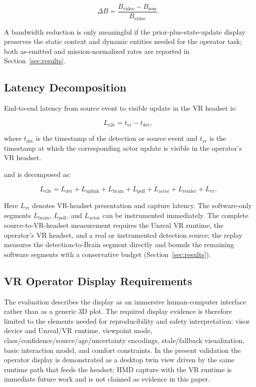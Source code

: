 \documentclass[fleqn]{VRIH2025}
\begin{document}
\begin{equation}
\Delta B = \frac{B_{\mathrm{video}} - B_{\mathrm{sem}}}{B_{\mathrm{video}}}.
\label{eq:bandwidth-reduction}
\end{equation}

A bandwidth reduction is only meaningful if the prior-plus-state-update display preserves the static context and dynamic entities needed for the operator task; both as-emitted and mission-normalized rates are reported in Section~\ref{sec:results}.

\subsection{Latency Decomposition}

End-to-end latency from source event to visible update in the VR headset is:

\begin{equation}
L_{\mathrm{e2e}} = t_{\mathrm{vr}} - t_{\mathrm{det}},
\label{eq:e2e-latency}
\end{equation}

where \(t_{\mathrm{det}}\) is the timestamp of the detection or source event and \(t_{\mathrm{vr}}\) is the timestamp at which the corresponding actor update is visible in the operator's VR headset.

and is decomposed as:

\begin{equation}
L_{\mathrm{e2e}} =
L_{\mathrm{det}} +
L_{\mathrm{uplink}} +
L_{\mathrm{brain}} +
L_{\mathrm{poll}} +
L_{\mathrm{actor}} +
L_{\mathrm{render}} +
L_{\mathrm{vr}}.
\label{eq:latency-components}
\end{equation}

Here \(L_{\mathrm{vr}}\) denotes VR-headset presentation and capture latency. The software-only segments \(L_{\mathrm{brain}}\), \(L_{\mathrm{poll}}\), and \(L_{\mathrm{actor}}\) can be instrumented immediately. The complete source-to-VR-headset measurement requires the Unreal VR runtime, the operator's VR headset, and a real or instrumented detection source; the replay measures the detection-to-Brain segment directly and bounds the remaining software segments with a conservative budget (Section~\ref{sec:results}).

\subsection{VR Operator Display Requirements}

The evaluation describes the display as an immersive human-computer interface rather than as a generic 3D plot. The required display evidence is therefore limited to the elements needed for reproducibility and safety interpretation: visor device and Unreal/VR runtime, viewpoint mode, class/confidence/source/age/uncertainty encodings, stale/fallback visualization, basic interaction model, and comfort constraints. In the present validation the operator display is demonstrated as a desktop twin view driven by the same runtime path that feeds the headset; HMD capture with the VR runtime is immediate future work and is not claimed as evidence in this paper.
\end{document}
